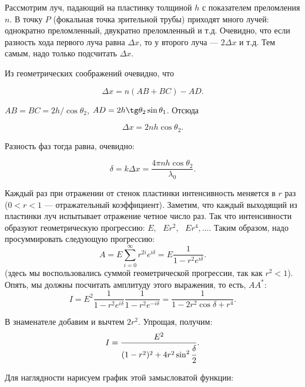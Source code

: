 \documentclass[11pt,a4paper]{article}
\numberwithin{equation}{section}
\begin{document}
Рассмотрим луч, падающий на пластинку толщиной $h$ с показателем
преломления $n$. В точку $P$ (фокальная точка зрительной трубы)
приходят много лучей: однократно преломленный, двукратно преломленный
и т.д. Очевидно, что если разность хода первого луча равна $\Delta x$,
то у второго луча --- $2 \Delta x$ и т.д. Тем самым, надо только
подсчитать $\Delta x$.

Из геометрических соображений очевидно, что 

\begin{equation}
\Delta x = n (AB + BC) - AD.
\end{equation}

$AB = BC = 2h / \cos \theta_2$, $AD = 2 h \tg \theta_2 \sin \theta_1$. Отсюда 

\begin{equation}
\Delta x = 2 n h \cos \theta_2.
\end{equation}

Разность фаз тогда равна, очевидно:

\begin{equation}
\delta = k \Delta x = \frac{4 \pi n h \cos \theta_2}{\lambda_0}.
\end{equation}

Каждый раз при отражении от стенок пластинки интенсивность меняется в
$r$ раз ($0<r<1$ --- отражательный коэффициент). Заметим, что каждый
выходящий из пластинки луч испытывает отражение четное число раз. Так
что интенсивности образуют геометрическую прогрессию: $E, \mbox{ }
Er^2, \mbox{ } Er^4, \ldots$. Таким образом, надо просуммировать
следующую прогрессию:
\begin{equation}
A = E \sum_{i=0}^{\infty} r^{2i} e^{i \delta} = E \frac{1}{1 - r^2 e^{i \delta}}.
\end{equation}
(здесь мы воспользовались суммой геометрической прогрессии, так как
$r^2 <1$). Опять, мы должны посчитать амплитуду этого выражения, то
есть, $AA^{*}$:
\begin{equation}
I =E^2 \frac{1}{1 - r^2 e^{i \delta}} \frac{1}{1 - r^2 e^{-i \delta}} = \frac{1}{1 - 2r^2 \cos \delta + r^4}.
\end{equation}

В знаменателе добавим и вычтем $2r^2$. Упрощая, получим:
\begin{equation}
I = \frac{E^2}{(1-r^2)^2 + 4 r^2 \sin^2 \cfrac{\delta}{2}}.
\end{equation}

Для наглядности нарисуем график этой замысловатой функции:
\end{document}
